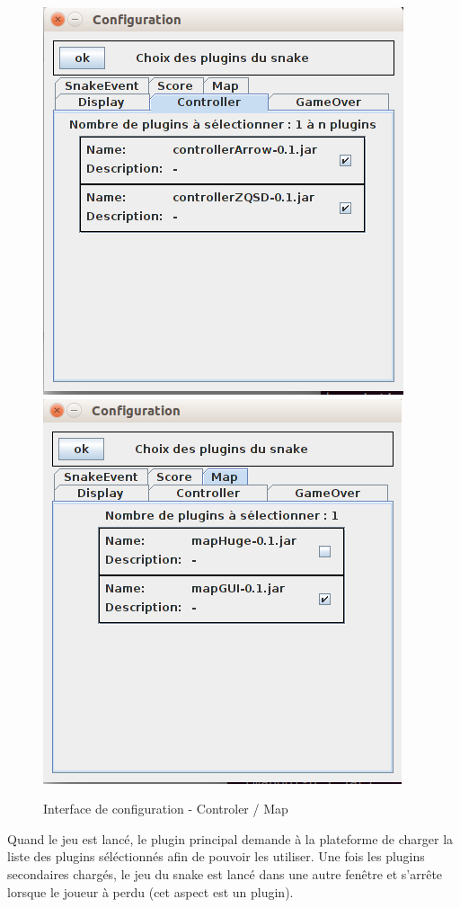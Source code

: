 \documentclass[12pt,a4paper]{article}
\begin{document}
\begin{figure}[h]
    \centering
    \includegraphics[scale=0.4]{ressources/configurationControler.png}
    \includegraphics[scale=0.4]{ressources/configurationMap.png}
    \caption{Interface de configuration - Controler / Map}
\end{figure}       
    
Quand le jeu est lancé, le plugin principal demande à la plateforme de charger 
la liste des plugins séléctionnés afin de pouvoir les utiliser. Une fois les 
plugins secondaires chargés, le jeu du snake est lancé dans une autre fenêtre et
s'arrête lorsque le joueur à perdu (cet aspect est un plugin).
\end{document}
